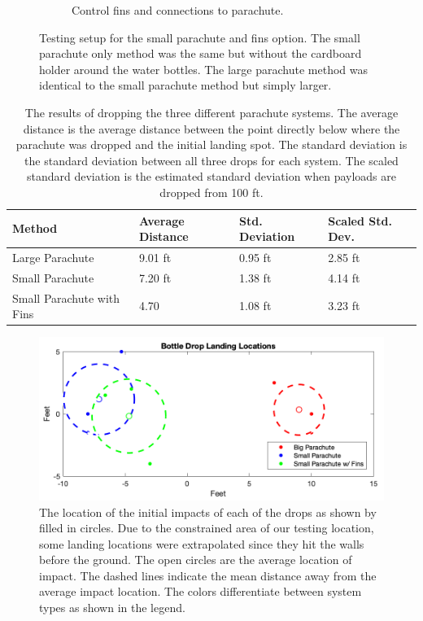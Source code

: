 \documentclass[]{auvsi_doc}
\begin{document}
\begin{figure}[ht]
\begin{subfigure}{0.49\linewidth}
     \caption{Control fins and connections to parachute.}\label{fig:ControlFins}
   \end{subfigure}
\caption{Testing setup for the small parachute and fins option. The small parachute only method was the same but without the cardboard holder around the water bottles. The large parachute method was identical to the small parachute method but simply larger.} 
\label{fig:combined}
\end{figure}

\begin{table}[h]
\caption{The results of dropping the three different parachute systems. The average distance is the average distance between the point directly below where the parachute was dropped and the initial landing spot. The standard deviation is the standard deviation between all three drops for each system. The scaled standard deviation is the estimated standard deviation when payloads are dropped from 100 ft. }
\label{table:results}

\begin{tabular}{| l | l | l | l |}
\hline
Method & Average Distance & Std. Deviation & Scaled Std. Dev.\\
\hline
Large Parachute & 9.01 ft  & 0.95 ft & 2.85 ft\\
Small Parachute & 7.20 ft  & 1.38 ft & 4.14 ft\\
Small Parachute with Fins & 4.70  & 1.08 ft & 3.23 ft\\
\hline

\end{tabular}

\end{table}

\begin{figure}[h]
\includegraphics[width=\columnwidth]{LandingLocations.png}
\caption{The location of the initial impacts of each of the drops as shown by filled in circles. Due to the constrained area of our testing location, some landing locations were extrapolated since they hit the walls before the ground. The open circles are the average location of impact. The dashed lines indicate the mean distance away from the average impact location. The colors differentiate between system types as shown in the legend.}
\label{fig:locations}
\end{figure}
\end{document}
